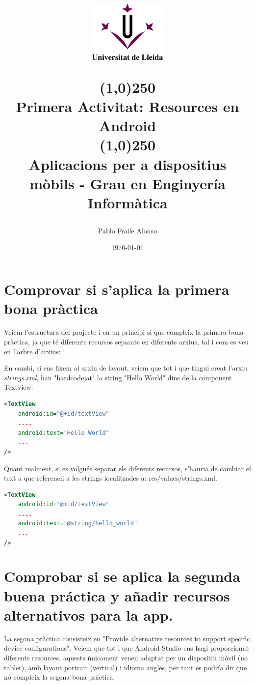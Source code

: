 \documentclass[12pt, letterpaper]{article}
\title{%
    \begin{center}
	\includegraphics[width=4cm,height=3cm]{udl.png}
    \end{center}
    \line(1,0){250}\\[0.3cm]
    \textbf{Primera Activitat: Resources en Android} \\
    \line(1,0){250}
    \\[0.5cm]
	\large Aplicacions per a dispositius mòbils - Grau en Enginyería Informàtica
}
\author{Pablo Fraile Alonso}
\date{\today}
\begin{document}
    
\maketitle
\thispagestyle{empty}
\newpage
\tableofcontents
\listoffigures
\newpage

\section{Comprovar si s'aplica la primera bona pràctica}
Veiem l'estructura del projecte i en un principi si que compleix la primera bona pràctica, ja que té diferents recursos separats en diferents arxius, tal i com es veu en l'arbre d'arxius:

\vspace{0.5cm}
\vspace{0.5cm}

En cambi, si ens fixem al arxiu de layout, veiem que tot i que tingui creat l'arxiu \textit{strings.xml}, han "hardcodejat" la string "Hello World" dins de la component Textview:

\begin{lstlisting}[language=XML]
<TextView
    android:id="@+id/textView"
    ....
    android:text="Hello World"
    ...
/>
\end{lstlisting}

Quant realment, si es volgués separar els diferents recursos, s'hauria de cambiar el text a que referencii a les strings localitzades a: res/values/strings.xml.

\begin{lstlisting}[language=XML]
<TextView
    android:id="@+id/textView"
    ....
    android:text="@string/hello_world"
    ...
/>
\end{lstlisting}

\newpage
\section{Comprobar si se aplica la segunda buena práctica y añadir recursos alternativos para la app. }
La segona pràctica consisteix en "Provide alternative resources to support specific device configurations". Veiem que tot i que Android Studio ens hagi proporcionat diferents resources, aquests únicament venen adaptat
per un dispositiu móvil (no tablet), amb layout portrait (vertical) i idioma anglés, per tant es podría dir que no compleix la segona bona pràctica.\\
\end{document}
